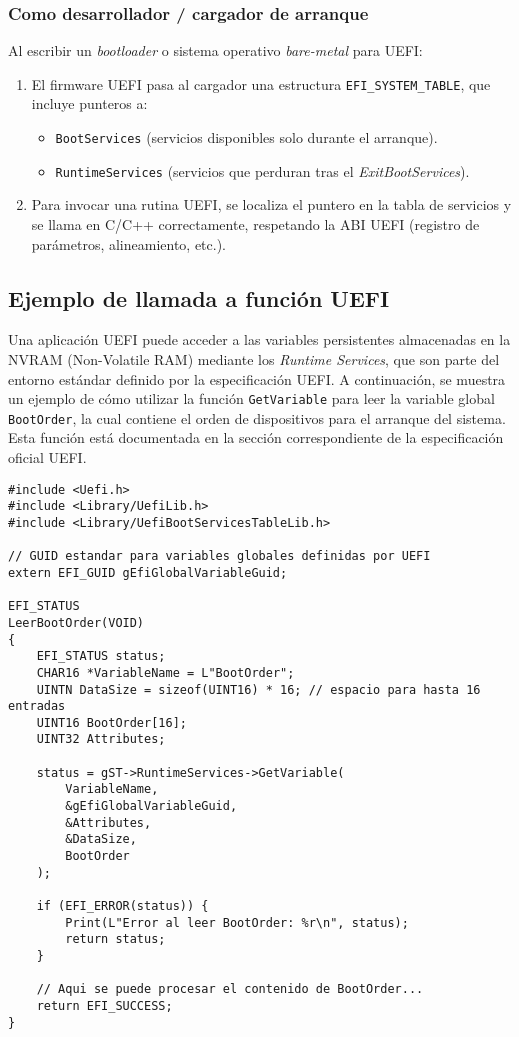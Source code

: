 \documentclass[a4paper,12pt]{article}
\begin{document}
\subsubsection{Como desarrollador / cargador de arranque}
Al escribir un \emph{bootloader} o sistema operativo \emph{bare-metal} para UEFI:
\begin{enumerate}[noitemsep]
  \item El firmware UEFI pasa al cargador una estructura \texttt{EFI\_SYSTEM\_TABLE}, que incluye punteros a:
    \begin{itemize}[noitemsep]
      \item \texttt{BootServices} (servicios disponibles solo durante el arranque).
      \item \texttt{RuntimeServices} (servicios que perduran tras el \emph{ExitBootServices}).
    \end{itemize}
  \item Para invocar una rutina UEFI, se localiza el puntero en la tabla de servicios y se llama en C/C++ correctamente, respetando la ABI UEFI (registro de parámetros, alineamiento, etc.).
\end{enumerate}

\subsection{Ejemplo de llamada a función UEFI}

Una aplicación UEFI puede acceder a las variables persistentes almacenadas en la NVRAM (Non-Volatile RAM) mediante los \emph{Runtime Services}, que son parte del entorno estándar definido por la especificación UEFI. A continuación, se muestra un ejemplo de cómo utilizar la función \texttt{GetVariable} para leer la variable global \texttt{BootOrder}, la cual contiene el orden de dispositivos para el arranque del sistema. Esta función está documentada en la sección correspondiente de la especificación oficial UEFI.

\begin{lstlisting}[caption={Lectura de la variable \texttt{BootOrder} mediante \texttt{GetVariable}}, label={lst:getvariable}]
#include <Uefi.h>
#include <Library/UefiLib.h>
#include <Library/UefiBootServicesTableLib.h>

// GUID estandar para variables globales definidas por UEFI
extern EFI_GUID gEfiGlobalVariableGuid;

EFI_STATUS
LeerBootOrder(VOID)
{
    EFI_STATUS status;
    CHAR16 *VariableName = L"BootOrder";
    UINTN DataSize = sizeof(UINT16) * 16; // espacio para hasta 16 entradas
    UINT16 BootOrder[16];
    UINT32 Attributes;

    status = gST->RuntimeServices->GetVariable(
        VariableName,
        &gEfiGlobalVariableGuid,
        &Attributes,
        &DataSize,
        BootOrder
    );

    if (EFI_ERROR(status)) {
        Print(L"Error al leer BootOrder: %r\n", status);
        return status;
    }

    // Aqui se puede procesar el contenido de BootOrder...
    return EFI_SUCCESS;
}
\end{lstlisting}
\end{document}
